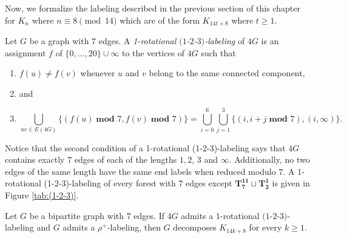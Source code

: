 Now, we formalize the labeling described in the previous section of this chapter for $K_{n}$ where $n\equiv 8\pmod{14}$ which are of the form $K_{14t+8}$ where $t\geq 1$. 

\begin{definition}\label{def:1-2-3-1-rot}
    Let $G$ be a graph with $7$ edges. A \emph{1-rotational $(1$-$2$-$3)$-labeling} of $4G$ is an assignment $f$ of $\{0,\dots,20\} \cup \infty$ to the vertices of $4G$ such that
    \begin{enumerate}
        \item $f(u) \neq f(v)$ whenever $u$ and $v$ belong to the same connected component, 
        \item[] and
        \item  $$ \bigcup_{uv\in E(4G)} \{(f(u)\; \textbf{mod } 7,f(v)\; \textbf{mod } 7)\}= \bigcup_{i=0}^{6} \bigcup_{j=1}^{3} \{(i,i+j \; \textbf{mod } 7), (i,\infty)\}.$$
    \end{enumerate}
\end{definition}
Notice that the second condition of a 1-rotational (1-2-3)-labeling says that $4G$ contains exactly $7$ edges of each of the lengths $1,2$, $3$ and $\infty$. Additionally, no two edges of the same length have the same end labels when reduced modulo $7.$ A 1-rotational (1-2-3)-labeling of every forest with $7$ edges except $\mathbf{T_{7}^{11}}\sqcup\mathbf{T_{2}^{1}}$ is given in Figure \ref{tab:(1-2-3)}.

\begin{thm}\label{thm:1-2-3 1-rot plus rho}
    Let $G$ be a bipartite graph with $7$ edges. If $4G$ admits a $1$-rotational  $(1$-$2$-$3)$-labeling and $G$ admits a $\rho^{+}$-labeling, then $G$ decomposes $K_{14k+8}$ for every $k\geq1.$
\end{thm}


